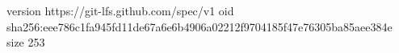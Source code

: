version https://git-lfs.github.com/spec/v1
oid sha256:eee786c1fa945fd11de67a6e6b4906a02212f9704185f47e76305ba85aee384e
size 253
